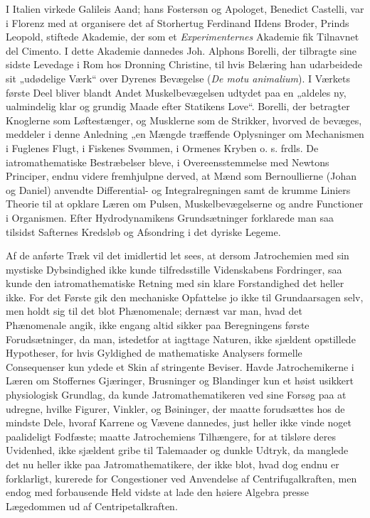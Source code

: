 \documentclass[12pt,a4paper]{book}
\begin{document}
I Italien virkede Galileis Aand; hans Fostersøn og Apologet, Benedict
Castelli, var i Florenz med at organisere det af Storhertug Ferdinand
IIdens Broder, Prinds Leopold, stiftede Akademie, der som et
\emph{Experimenternes} Akademie fik Tilnavnet del Cimento. I dette Akademie
dannedes Joh. Alphons Borelli, der tilbragte sine sidste Levedage i
Rom hos Dronning Christine, til hvis Belæring han udarbeidede sit
„udødelige Værk“ over Dyrenes Bevægelse (\textit{De motu
animalium}). I Værkets første Deel bliver blandt Andet
Muskelbevægelsen udtydet paa en „aldeles ny, ualmindelig klar
og grundig Maade efter Statikens Love“. Borelli, der betragter
Knoglerne som Løftestænger, og Musklerne som de Strikker, hvorved de
bevæges, meddeler i denne Anledning „en Mængde træffende Oplysninger
om Mechanismen i Fuglenes Flugt, i Fiskenes Svømmen, i Ormenes
Kryben
o. s. frdls.
De iatromathematiske Bestræbelser bleve, i Overeensstemmelse med
Newtons Principer, endnu videre fremhjulpne derved, at Mænd som
Bernoullierne (Johan og Daniel) anvendte Differential- og
Integralregningen samt de krumme Liniers Theorie til at opklare
Læren om Pulsen, Muskelbevægelserne og andre Functioner i
Organismen. Efter Hydrodynamikens Grundsætninger forklarede man saa
tilsidst Safternes Kredsløb og Afsondring i det dyriske Legeme.

Af de anførte Træk vil det imidlertid let sees, at dersom
Jatrochemien med sin mystiske Dybsindighed ikke kunde tilfredsstille
Videnskabens Fordringer, saa kunde den iatromathematiske Retning med
sin klare Forstandighed det heller ikke. For det Første gik den
mechaniske Opfattelse jo ikke til Grundaarsagen selv, men holdt sig
til det blot Phænomenale; dernæst var man, hvad det Phænomenale
angik, ikke engang altid sikker paa Beregningens første
Forudsætninger, da man, istedetfor at iagttage Naturen, ikke
sjældent opstillede Hypotheser, for hvis Gyldighed de mathematiske
Analysers formelle Consequenser kun ydede et Skin af stringente
Beviser. Havde Jatrochemikerne i Læren om Stoffernes Gjæringer,
Brusninger og Blandinger kun et høist usikkert physiologisk
Grundlag, da kunde Jatromathematikeren ved sine Forsøg paa at
udregne, hvilke Figurer, Vinkler, og Bøininger, der maatte
forudsættes hos de mindste Dele, hvoraf Karrene og Vævene dannedes,
just heller ikke vinde noget paalideligt Fodfæste; maatte
Jatrochemiens Tilhængere, for at tilsløre deres Uvidenhed, ikke
sjældent gribe til Talemaader og dunkle Udtryk, da manglede det nu
heller ikke paa Jatromathematikere, der ikke blot, hvad dog endnu er
forklarligt, kurerede for Congestioner ved Anvendelse af
Centrifugalkraften,
men endog med forbausende Held vidste at lade den høiere Algebra
presse Lægedommen ud af Centripetalkraften.
\end{document}
